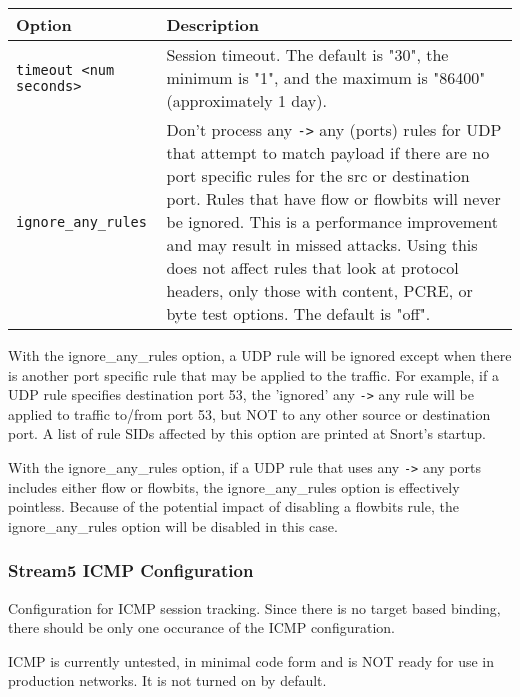 \documentclass[english]{report}
\newenvironment{note}{
\samepage
    \vspace{10pt}{\textsf{
        {\hspace{7pt}\Huge{$\triangle$\hspace{-12.5pt}{\Large{$^!$}}}}\hspace{5pt}
        {\Large{NOTE}}
    }
    }
   \begin{center}
    \par\vspace{-17pt}

    \begin{lrbox}{\savepar}
    \begin{minipage}[r]{6in}
}
{
    \end{minipage}
    \end{lrbox}
    \fbox{
        \usebox{
            \savepar
	}
    }
    \par\vskip10pt
    \end{center}
}
\begin{document}
\begin{tabular}{| l | p{3.5in} |}
\hline
\textbf{Option} & \textbf{Description}\\
\hline 
\hline 
\texttt{timeout <num seconds>} & Session timeout.  The default is "30", the minimum is "1", and the maximum is "86400" (approximately 1 day).\\
\hline
\texttt{ignore\_any\_rules} & Don't process any \texttt{->} any (ports) rules for UDP that attempt to match payload if there are no port specific rules for the src or destination port.  Rules that have flow or flowbits will never be ignored.  This is a performance improvement and may result in missed attacks.  Using this does not affect rules that look at protocol headers, only those with content, PCRE, or byte test options.  The default is "off".\\
\hline
\end{tabular}

\begin{note}
With the ignore\_any\_rules option, a UDP rule will be ignored except when
there is another port specific rule that may be applied to the traffic.  For
example, if a UDP rule specifies destination port 53, the 'ignored' any \texttt{->} any
rule will be applied to traffic to/from port 53, but NOT to any other
source or destination port.  A list of rule SIDs affected by this option
are printed at Snort's startup.
\end{note}

\begin{note}
With the ignore\_any\_rules option, if a UDP rule that uses any \texttt{->} any
ports includes either flow or flowbits, the ignore\_any\_rules option is
effectively pointless.  Because of the potential impact of disabling a flowbits
rule, the ignore\_any\_rules option will be disabled in this case.
\end{note}

\subsubsection{Stream5 ICMP Configuration}

Configuration for ICMP session tracking.  Since there is no target based
binding, there should be only one occurance of the ICMP configuration.

\begin{note}
ICMP is currently untested, in minimal code form and is NOT ready
for use in production networks.  It is not turned on by default.
\end{note}
\end{document}
